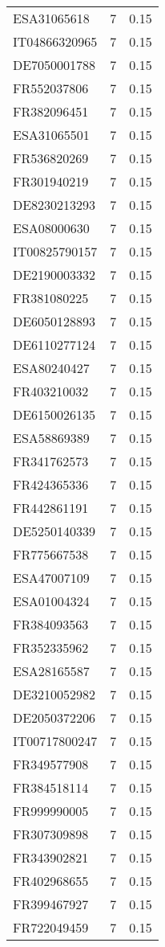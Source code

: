 \begin{table*}[htbp]
\begin{tabular}{lrr}
ESA31065618 & 7 & 0.15 \\
IT04866320965 & 7 & 0.15 \\
DE7050001788 & 7 & 0.15 \\
FR552037806 & 7 & 0.15 \\
FR382096451 & 7 & 0.15 \\
ESA31065501 & 7 & 0.15 \\
FR536820269 & 7 & 0.15 \\
FR301940219 & 7 & 0.15 \\
DE8230213293 & 7 & 0.15 \\
ESA08000630 & 7 & 0.15 \\
IT00825790157 & 7 & 0.15 \\
DE2190003332 & 7 & 0.15 \\
FR381080225 & 7 & 0.15 \\
DE6050128893 & 7 & 0.15 \\
DE6110277124 & 7 & 0.15 \\
ESA80240427 & 7 & 0.15 \\
FR403210032 & 7 & 0.15 \\
DE6150026135 & 7 & 0.15 \\
ESA58869389 & 7 & 0.15 \\
FR341762573 & 7 & 0.15 \\
FR424365336 & 7 & 0.15 \\
FR442861191 & 7 & 0.15 \\
DE5250140339 & 7 & 0.15 \\
FR775667538 & 7 & 0.15 \\
ESA47007109 & 7 & 0.15 \\
ESA01004324 & 7 & 0.15 \\
FR384093563 & 7 & 0.15 \\
FR352335962 & 7 & 0.15 \\
ESA28165587 & 7 & 0.15 \\
DE3210052982 & 7 & 0.15 \\
DE2050372206 & 7 & 0.15 \\
IT00717800247 & 7 & 0.15 \\
FR349577908 & 7 & 0.15 \\
FR384518114 & 7 & 0.15 \\
FR999990005 & 7 & 0.15 \\
FR307309898 & 7 & 0.15 \\
FR343902821 & 7 & 0.15 \\
FR402968655 & 7 & 0.15 \\
FR399467927 & 7 & 0.15 \\
FR722049459 & 7 & 0.15 \\

\end{tabular}
\end{table*}
